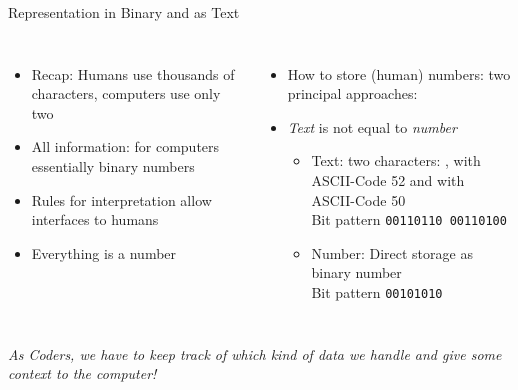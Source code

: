 \begin{frame}[fragile]{Representation in Binary and as Text}
%
\begin{columns}[T]
\begin{itemize}
\item Recap: Humans use thousands of characters, computers use only two
\item All information: for computers essentially binary numbers
\item Rules for interpretation allow interfaces to humans
\item[\Thus] Everything is a number
\end{itemize}
%
\begin{itemize}
\item How to store (human) numbers: two principal approaches:
\item \emph{Text}  is not equal to \emph{number} 
	\begin{itemize}
	\item Text: two characters: , with ASCII-Code 52 and  with ASCII-Code 50\\
		Bit pattern \texttt{00110110 00110100}
	\item Number: Direct storage as binary number\\
		Bit pattern \texttt{00101010}
	\end{itemize}
\end{itemize}
\end{columns}
%
\begin{center}
	\begin{large}
	\Thus \emph{As Coders, we have to keep track of which kind of data we handle and give some context to the computer!}
	\end{large}
\end{center}
%
\end{frame}


